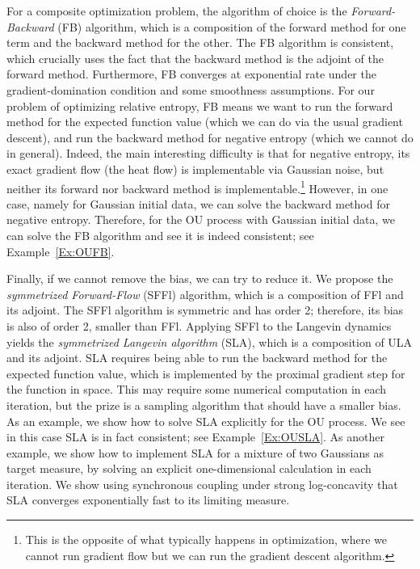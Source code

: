 \documentclass[final,12pt]{colt2018}
\begin{document}
For a composite optimization problem, the algorithm of choice is the {\em Forward-Backward} (FB) algorithm, which is a composition of the forward method for one term and the backward method for the other.
The FB algorithm is consistent, which crucially uses the fact that the backward method is the adjoint of the forward method.
Furthermore, FB converges at exponential rate under the gradient-domination condition and some smoothness assumptions.
For our problem of optimizing relative entropy, FB means we want to run the forward method for the expected function value (which we can do via the usual gradient descent), and run the backward method for negative entropy (which we cannot do in general).
Indeed, the main interesting difficulty is that for negative entropy, its exact gradient flow (the heat flow) is implementable via Gaussian noise, but neither its forward nor backward method is implementable.\footnote{
This is the opposite of what typically happens in optimization, where we cannot run gradient flow but we can run the gradient descent algorithm. 
}
However, in one case, namely for Gaussian initial data, we can solve the backward method for negative entropy. 
Therefore, for the OU process with Gaussian initial data, we can solve the FB algorithm and see it is indeed consistent; see Example~\ref{Ex:OUFB}.

Finally, if we cannot remove the bias, we can try to reduce it.
We propose the {\em symmetrized Forward-Flow} (SFFl) algorithm, which is a composition of FFl and its adjoint.
The SFFl algorithm is symmetric and has order 2;
therefore, its bias is also of order 2, smaller than FFl.
Applying SFFl to the Langevin dynamics yields the {\em symmetrized Langevin algorithm} (SLA), which is a composition of ULA and its adjoint.
SLA requires being able to run the backward method for the expected function value, which is implemented by the proximal gradient step for the function in space.
This may require some numerical computation in each iteration, but the prize is a sampling algorithm that should have a smaller bias.
As an example, we show how to solve SLA explicitly for the OU process.
We see in this case SLA is in fact consistent; see Example~\ref{Ex:OUSLA}.
As another example, we show how to implement SLA for a mixture of two Gaussians as target measure, by solving an explicit one-dimensional calculation in each iteration.
We show using synchronous coupling under strong log-concavity that SLA converges exponentially fast to its limiting measure.
\end{document}
